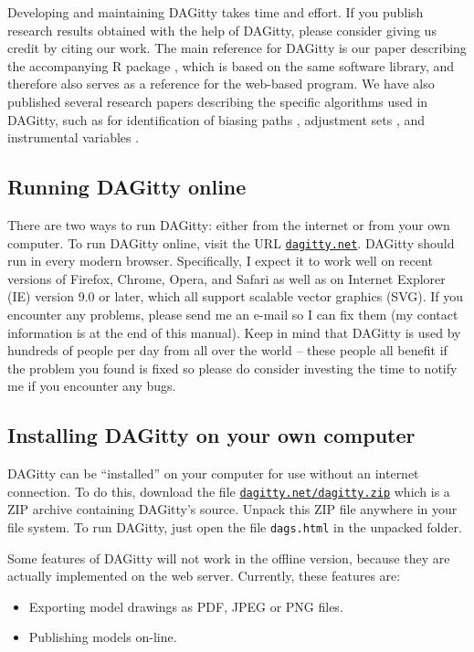 \documentclass[a4paper]{article} %
\newcommand{\pp}{DAGitty\xspace}
\begin{document}
Developing and maintaining \pp takes time and effort.
If you publish research results obtained
with the help of \pp, please 
consider giving us credit by citing our work. 
The main reference
for \pp is our paper describing the accompanying R package \cite{textor_robust_2016}, 
which is based on the same software library, and therefore also serves as a reference for the web-based program.
 We have also published several research papers describing the specific algorithms used in DAGitty, such as for identification of biasing paths \cite{TextorL2011}, adjustment sets \cite{textor14_uai}, and instrumental variables
\cite{zander15_instrument}.




\subsection{Running \pp online}

There are two ways to run \pp: either from the internet or from your
own computer. To run \pp online, visit the URL
\href{https://dagitty.net}{\tt dagitty.net}.
\pp should run in every modern browser. Specifically, I expect it
to work well on recent versions of Firefox, Chrome, Opera, and Safari
as well as on Internet Explorer (IE) version 9.0 or later, which all
support scalable vector graphics (SVG). If you encounter any problems, please send
me an e-mail so I can fix them (my contact information is at the end of this manual). 
Keep in mind that \pp is used by hundreds of people per day from all over the world -- these people all benefit if the problem you found is fixed so please do consider investing the time to notify me if you encounter any bugs.

\subsection{Installing \pp on your own computer} 

\pp can be ``installed'' on your computer for use without an internet
connection. To do this, download the file 
\href{https://dagitty.net/dagitty.zip}{\tt dagitty.net/dagitty.zip}
which is a ZIP archive containing \pp's source. Unpack this ZIP file anywhere
in your file system. To run \pp, just open the file \verb|dags.html| in the
unpacked folder. 

Some features of \pp will not work in the offline version, because they
are actually implemented on the web server. Currently, these features are:
\begin{itemize}
\item Exporting model drawings as PDF, JPEG or PNG files.
\item Publishing models on-line.
\end{itemize}
\end{document}
